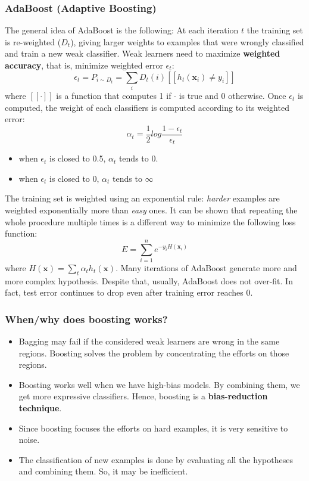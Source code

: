 \subsubsection{AdaBoost (Adaptive Boosting)}
The general idea of AdaBoost is the following: At each iteration $t$ the training set is re-weighted ($D_{t}$), giving larger weights to examples that were wrongly classified and train a new weak classifier.\newline\newline
Weak learners need to maximize \textbf{weighted accuracy}, that is, minimize weighted error $\epsilon_{t}$:
\[\epsilon_{t} = P_{i \sim D_{t}} = \sum_{i}D_{t}(i)[\![h_{t}(\textbf{x}_{i}) \neq y_{i}]\!]\]
where $[\![\cdot]\!]$ is a function that computes 1 if $\cdot$ is true and 0 otherwise. Once $\epsilon_{t}$ is computed, the weight of each classifiers is computed according to its weighted error:
\[\alpha_{t} = \frac{1}{2}log\frac{1 - \epsilon_{t}}{\epsilon_{t}}\]
\begin{itemize}
    \item when $\epsilon_{t}$ is closed to 0.5, $\alpha_{t}$ tends to 0.
    \item when $\epsilon_{t}$ is closed to 0, $\alpha_{t}$ tends to $\infty$
\end{itemize}
The training set is weighted using an exponential rule: \textit{harder} examples are weighted exponentially more than \textit{easy} ones.\newline\newline
It can be shown that repeating the whole procedure multiple times is a different way to minimize the following loss function:
\[E = \sum_{i=1}^{n}e^{-y_{i}H(\textbf{x}_{i})}\]
where $H(\textbf{x}) = \sum_{t}\alpha_{t}h_{t}(\textbf{x})$.\newline\newline
Many iterations of AdaBoost generate more and more complex hypothesis. Despite that, usually, AdaBoost does not over-fit. In fact, test error continues to drop even after training error reaches 0.

\subsubsection{When/why does boosting works?}
\begin{itemize}
    \item Bagging may fail if the considered weak learners are wrong in the same regions. Boosting solves the problem by concentrating the efforts on those regions.
    \item Boosting works well when we have high-bias models. By combining them, we get more expressive classifiers. Hence, boosting is a \textbf{bias-reduction technique}.
    \item Since boosting focuses the efforts on hard examples, it is very sensitive to noise.
    \item The classification of new examples is done by evaluating all the hypotheses and combining them. So, it may be inefficient.
\end{itemize}
